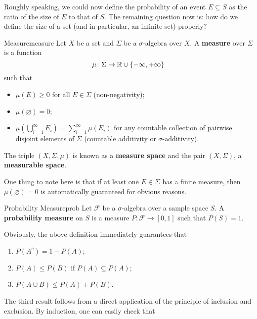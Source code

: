 \documentclass[math, code]{amznotes}
\theoremstyle{remark}
\begin{document}
Roughly speaking, we could now define the probability of an event $E \subseteq S$ as the ratio of the size of $E$ to that of $S$. The remaining question now is: how do we define the size of a set (and in particular, an infinite set) properly?
\begin{dfnbox}{Measure}{measure}
    Let $X$ be a set and $\Sigma$ be a $\sigma$-algebra over $X$. A {\color{red} \textbf{measure}} over $\Sigma$ is a function 
    \begin{equation*}
        \mu \colon \Sigma \to \mathbb{R} \cup \{-\infty, +\infty\}
    \end{equation*}
    such that 
    \begin{itemize}
        \item $\mu\left(E\right) \geq 0$ for all $E \in \Sigma$ (non-negativity);
        \item $\mu\left(\varnothing\right) = 0$;
        \item $\mu\left(\bigcup_{i = 1}^{\infty}E_i\right) = \sum_{i = 1}^{\infty}\mu\left(E_i\right)$ for any countable collection of pairwise disjoint elements of $\Sigma$ (countable additivity or $\sigma$-additivity).
    \end{itemize}
    The triple $\left(X, \Sigma, \mu\right)$ is known as a {\color{red} \textbf{measure space}} and the pair $\left(X, \Sigma\right)$, a {\color{red} \textbf{measurable space}}.
\end{dfnbox}
One thing to note here is that if at least one $E \in \Sigma$ has a finite measure, then $\mu\left(\varnothing\right) = 0$ is automatically guaranteed for obvious reasons.
\begin{dfnbox}{Probability Measure}{prob}
    Let $\mathcal{F}$ be a $\sigma$-algebra over a sample space $S$. A {\color{red} \textbf{probability measure}} on $S$ is a measure $P \colon \mathcal{F} \to \left[0, 1\right]$ such that $P\left(S\right) = 1$.
\end{dfnbox}
Obviously, the above definition immediately guarantees that 
\begin{enumerate}
    \item $P\left(A^c\right) = 1 - P\left(A\right)$;
    \item $P\left(A\right) \leq P\left(B\right)$ if $P\left(A\right) \subseteq P\left(A\right)$;
    \item $P\left(A \cup B\right) \leq P\left(A\right) + P\left(B\right)$.
\end{enumerate}
The third result follows from a direct application of the principle of inclusion and exclusion. By induction, one can easily check that 
\end{document}
